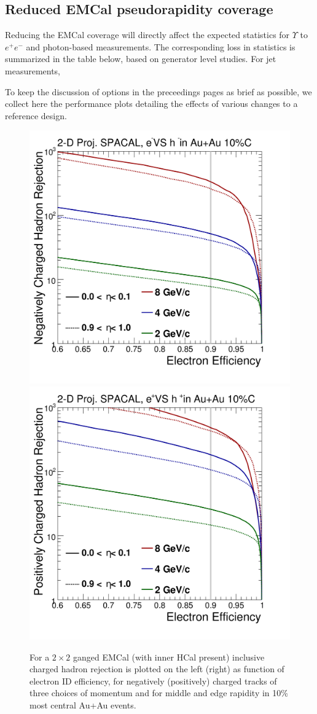 \subsection{Reduced EMCal pseudorapidity coverage}
Reducing the EMCal coverage will directly affect the expected statistics for $\Upsilon$ to $e^+ e^-$ and photon-based measurements. The 
corresponding loss in statistics is summarized in the table below, based on generator level studies. For jet measurements, 


To keep the discussion of options in the preceedings pages as brief as
possible, we collect here the performance plots detailing the effects
of various changes to a reference design.

\begin{figure}[hbt]
  \centering
  \includegraphics[width=0.4\linewidth]{figs/DrawEcal_Likelihood_Sum_RejectionCurve_AuAuSummary}
  \hspace{0.1\linewidth}
  \includegraphics[width=0.4\linewidth]{figs/DrawEcal_Likelihood_Sum_RejectionCurve_AuAuSummaryPos}
  \caption{For a $2\times2$ ganged EMCal (with inner HCal present)
    inclusive charged hadron rejection is plotted on the left (right)
    as function of electron ID efficiency, for negatively (positively)
    charged tracks of three choices of momentum and for middle and
    edge rapidity in 10\% most central Au+Au events.}
  \label{fig:eid_auau}
\end{figure}

